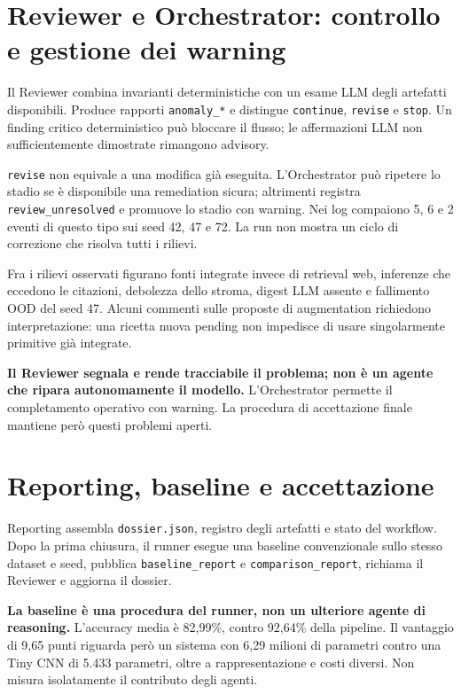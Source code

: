 \documentclass[11pt,a4paper]{article}
\newcommand{\artefatto}[1]{\nolinkurl{#1}}
\newcommand{\file}[1]{\nolinkurl{#1}}
\begin{document}
\section{Reviewer e Orchestrator: controllo e gestione dei warning}

Il Reviewer combina invarianti deterministiche con un esame LLM degli
artefatti disponibili. Produce rapporti \artefatto{anomaly_*} e distingue
\artefatto{continue}, \artefatto{revise} e \artefatto{stop}.
Un finding critico deterministico può bloccare il flusso; le affermazioni
LLM non sufficientemente dimostrate rimangono advisory.

\artefatto{revise} non equivale a una modifica già eseguita. L'Orchestrator
può ripetere lo stadio se è disponibile una remediation sicura; altrimenti
registra \artefatto{review_unresolved} e promuove lo stadio con warning.
Nei log compaiono 5, 6 e 2 eventi di questo tipo sui seed 42, 47 e 72.
La run non mostra un ciclo di correzione che risolva tutti i rilievi.

Fra i rilievi osservati figurano fonti integrate invece di retrieval web,
inferenze che eccedono le citazioni, debolezza dello stroma, digest LLM
assente e fallimento OOD del seed 47. Alcuni commenti sulle proposte di
augmentation richiedono interpretazione: una ricetta nuova pending non
impedisce di usare singolarmente primitive già integrate.

\textbf{Il Reviewer segnala e rende tracciabile il problema; non è un agente
che ripara autonomamente il modello.} L'Orchestrator permette il completamento
operativo con warning. La procedura di accettazione finale mantiene però
questi problemi aperti.

\section{Reporting, baseline e accettazione}

Reporting assembla \file{dossier.json}, registro degli artefatti e stato
del workflow. Dopo la prima chiusura, il runner esegue una baseline
convenzionale sullo stesso dataset e seed, pubblica
\artefatto{baseline_report} e \artefatto{comparison_report}, richiama
il Reviewer e aggiorna il dossier.

\textbf{La baseline è una procedura del runner, non un ulteriore agente
di reasoning.} L'accuracy media è 82,99\%, contro 92,64\% della pipeline.
Il vantaggio di 9,65 punti riguarda però un sistema con 6,29 milioni di
parametri contro una Tiny CNN di 5.433 parametri, oltre a rappresentazione
e costi diversi. Non misura isolatamente il contributo degli agenti.
\end{document}
